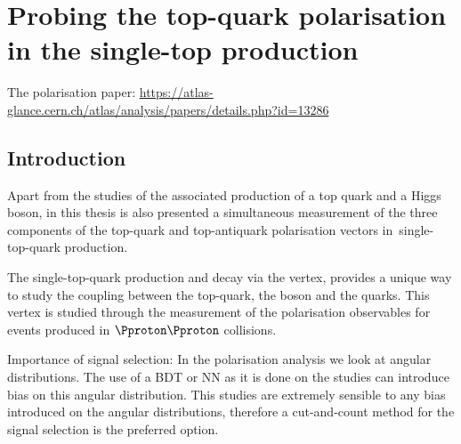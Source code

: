 \begin{comment}
%
%
\end{comment}


\chapter{Probing the top-quark polarisation in the single-top \tchannel production}
\label{chap:Polarisation}

	The polarisation paper: \url{https://atlas-glance.cern.ch/atlas/analysis/papers/details.php?id=13286}


\section{Introduction}
\label{chap:Polarisation:Intro}
Apart from the studies of the associated production of a top quark and a Higgs boson, in this thesis
is also presented a simultaneous measurement of the three components of the top-quark and top-antiquark polarisation
vectors in \tchan$\,$single-top-quark production.

The single-top-quark production and decay via the \Wtb vertex, provides a unique way to study
the coupling between the top-quark, the \PW boson and the \Pbottom quarks. This vertex is studied
through the measurement of the polarisation observables for events produced in $\Pproton \Pproton$ collisions.




Importance of signal selection: In the polarisation analysis we look at angular distributions. 
The use of a BDT or NN as it is done on the \tHq studies can introduce bias on this angular distribution.
This studies are extremely  sensible to any bias introduced on the angular distributions, therefore a cut-and-count method for the signal selection
is the preferred option.


